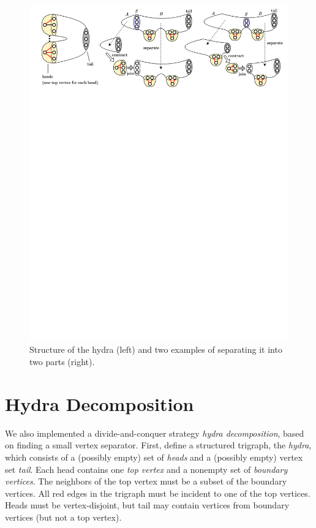\documentclass[a4paper,UKenglish,cleveref, autoref, thm-restate]{lipics-v2021}
\begin{document}
\begin{figure}[t!]
    \centering
    \includegraphics[clip,width=1.0\textwidth,trim={80 3300 80 0}]{images/decomp.png}
    \caption{Structure of the hydra (left) and
    two examples of separating it into two parts (right).
    }
    \label{fig:decomp} 
\end{figure}

\section{Hydra Decomposition}

We also implemented a divide-and-conquer strategy \emph{hydra decomposition},
based on finding a small vertex separator.
%
First, define a structured trigraph, the \emph{hydra},
which consists of a (possibly empty) set of \emph{heads} and
a (possibly empty) vertex set \emph{tail}.
%
Each head contains one \emph{top vertex} and a nonempty set of \emph{boundary vertices}.
The neighbors of the top vertex must be a subset of the boundary vertices.
All red edges in the trigraph must be incident to one of the top vertices.
Heads must be vertex-disjoint, but tail may contain vertices from boundary vertices
(but not a top vertex).
\end{document}
